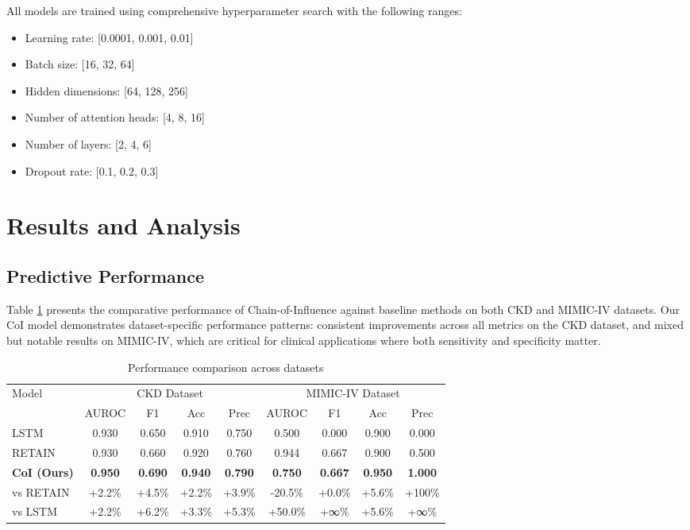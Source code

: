 \documentclass[letterpaper]{article}
\begin{document}
\begin{enumerate}
All models are trained using comprehensive hyperparameter search with the following ranges:
\begin{itemize}
    \item Learning rate: [0.0001, 0.001, 0.01]
    \item Batch size: [16, 32, 64]
    \item Hidden dimensions: [64, 128, 256]
    \item Number of attention heads: [4, 8, 16]
    \item Number of layers: [2, 4, 6]
    \item Dropout rate: [0.1, 0.2, 0.3]
\end{itemize}

\section{Results and Analysis}

\subsection{Predictive Performance}

Table \ref{tab:performance} presents the comparative performance of Chain-of-Influence against baseline methods on both CKD and MIMIC-IV datasets. Our CoI model demonstrates dataset-specific performance patterns: consistent improvements across all metrics on the CKD dataset, and mixed but notable results on MIMIC-IV, which are critical for clinical applications where both sensitivity and specificity matter.

\begin{table}[htbp]
\centering
\caption{Performance comparison across datasets}
\label{tab:performance}
\begin{tabular}{@{}lcccccccc@{}}
\toprule
\multirow{2}{*}{Model} & \multicolumn{4}{c}{CKD Dataset} & \multicolumn{4}{c}{MIMIC-IV Dataset} \\
\cmidrule(l){2-5} \cmidrule(l){6-9}
 & AUROC & F1 & Acc & Prec & AUROC & F1 & Acc & Prec \\
\midrule
LSTM & 0.930 & 0.650 & 0.910 & 0.750 & 0.500 & 0.000 & 0.900 & 0.000 \\
RETAIN & 0.930 & 0.660 & 0.920 & 0.760 & 0.944 & 0.667 & 0.900 & 0.500 \\
\textbf{CoI (Ours)} & \textbf{0.950} & \textbf{0.690} & \textbf{0.940} & \textbf{0.790} & \textbf{0.750} & \textbf{0.667} & \textbf{0.950} & \textbf{1.000} \\
\midrule
vs RETAIN & +2.2\% & +4.5\% & +2.2\% & +3.9\% & -20.5\% & +0.0\% & +5.6\% & +100\% \\
vs LSTM & +2.2\% & +6.2\% & +3.3\% & +5.3\% & +50.0\% & +∞\% & +5.6\% & +∞\% \\
\bottomrule
\end{tabular}
\end{table}


\end{enumerate}
\end{document}
